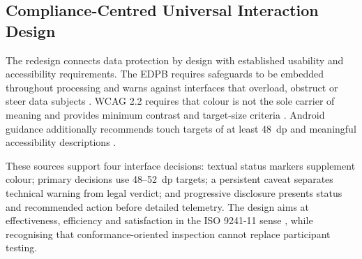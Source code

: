 
\subsection{Compliance-Centred Universal Interaction Design}

The redesign connects data protection by design with established usability and accessibility requirements. The EDPB requires safeguards to be embedded throughout processing and warns against interfaces that overload, obstruct or steer data subjects \cite{edpb2019,edpb2022}. WCAG 2.2 requires that colour is not the sole carrier of meaning and provides minimum contrast and target-size criteria \cite{wcag22}. Android guidance additionally recommends touch targets of at least 48~dp and meaningful accessibility descriptions \cite{androidaccess}.

These sources support four interface decisions: textual status markers supplement colour; primary decisions use 48--52~dp targets; a persistent caveat separates technical warning from legal verdict; and progressive disclosure presents status and recommended action before detailed telemetry. The design aims at effectiveness, efficiency and satisfaction in the ISO 9241-11 sense \cite{iso924111}, while recognising that conformance-oriented inspection cannot replace participant testing.

